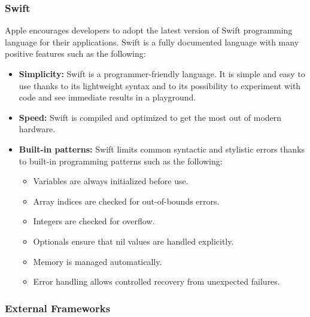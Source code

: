 \documentclass[titlepage]{article}
\begin{document}
	\subsubsection{Swift}
	Apple encourages developers to adopt the latest version of Swift programming language for their applications. Swift is a fully documented language with many positive features such as the following:
	\begin{itemize}
		\item {\bf Simplicity:}
		Swift is a programmer-friendly language. It is simple and easy to use thanks to its lightweight syntax and to its possibility to experiment with code and see immediate results in a playground.
		\item {\bf Speed:}
		Swift is compiled and optimized to get the most out of modern hardware.
		\item {\bf Built-in patterns:}
		Swift limits common syntactic and stylistic errors thanks to built-in programming patterns such as the following:
		\begin{itemize}
			\item {Variables are always initialized before use.}
			\item {Array indices are checked for out-of-bounds errors.}
			\item {Integers are checked for overflow.}
			\item {Optionals ensure that nil values are handled explicitly.}
			\item {Memory is managed automatically.}
			\item {Error handling allows controlled recovery from unexpected failures.}
		\end{itemize}
	\end{itemize}
	
	\subsubsection{External Frameworks}
	
\end{document}
